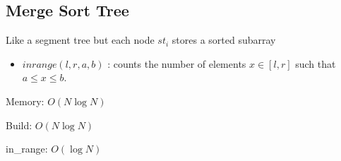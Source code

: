 \subsection{Merge Sort Tree}

Like a segment tree but each node $st_i$ stores a sorted subarray


\begin{itemize}
  \item \textbf{$inrange(l, r, a, b)$} : counts the number of elements $x \in [l, r]$ such that $ a \leq x \leq b$.
\end{itemize}

Memory: $O(N \log{N})$

Build: $O(N \log{N})$

in_range: $O(\log{N})$
